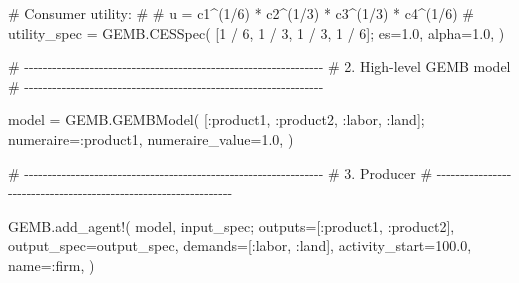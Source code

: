 \documentclass[
  letterpaper,
  DIV=11,
  numbers=noendperiod]{scrreprt}
\newenvironment{Shaded}{\begin{snugshade}}{\end{snugshade}}
\newcommand{\CommentTok}[1]{\textcolor[rgb]{0.37,0.37,0.37}{#1}}
\newcommand{\FloatTok}[1]{\textcolor[rgb]{0.68,0.00,0.00}{#1}}
\newcommand{\FunctionTok}[1]{\textcolor[rgb]{0.28,0.35,0.67}{#1}}
\newcommand{\NormalTok}[1]{\textcolor[rgb]{0.00,0.23,0.31}{#1}}
\newcommand{\OperatorTok}[1]{\textcolor[rgb]{0.37,0.37,0.37}{#1}}
\begin{document}
\begin{codelisting}
{\begin{Shaded}
\begin{Highlighting}[]
\CommentTok{\# Consumer utility:}
\CommentTok{\#}
\CommentTok{\#   u = c1\^{}(1/6) * c2\^{}(1/3) * c3\^{}(1/3) * c4\^{}(1/6)}
\CommentTok{\#}
\NormalTok{utility\_spec }\OperatorTok{=}\NormalTok{ GEMB.}\FunctionTok{CESSpec}\NormalTok{(}
\NormalTok{    [}\FloatTok{1} \OperatorTok{/} \FloatTok{6}\NormalTok{, }\FloatTok{1} \OperatorTok{/} \FloatTok{3}\NormalTok{, }\FloatTok{1} \OperatorTok{/} \FloatTok{3}\NormalTok{, }\FloatTok{1} \OperatorTok{/} \FloatTok{6}\NormalTok{];}
\NormalTok{    es}\OperatorTok{=}\FloatTok{1.0}\NormalTok{,}
\NormalTok{    alpha}\OperatorTok{=}\FloatTok{1.0}\NormalTok{,}
\NormalTok{)}


\CommentTok{\# {-}{-}{-}{-}{-}{-}{-}{-}{-}{-}{-}{-}{-}{-}{-}{-}{-}{-}{-}{-}{-}{-}{-}{-}{-}{-}{-}{-}{-}{-}{-}{-}{-}{-}{-}{-}{-}{-}{-}{-}{-}{-}{-}{-}{-}{-}{-}{-}{-}{-}{-}{-}{-}{-}{-}{-}{-}{-}{-}{-}{-}{-}{-}{-}}
\CommentTok{\# 2. High{-}level GEMB model}
\CommentTok{\# {-}{-}{-}{-}{-}{-}{-}{-}{-}{-}{-}{-}{-}{-}{-}{-}{-}{-}{-}{-}{-}{-}{-}{-}{-}{-}{-}{-}{-}{-}{-}{-}{-}{-}{-}{-}{-}{-}{-}{-}{-}{-}{-}{-}{-}{-}{-}{-}{-}{-}{-}{-}{-}{-}{-}{-}{-}{-}{-}{-}{-}{-}{-}{-}}

\NormalTok{model }\OperatorTok{=}\NormalTok{ GEMB.}\FunctionTok{GEMBModel}\NormalTok{(}
\NormalTok{    [}\OperatorTok{:}\NormalTok{product1, }\OperatorTok{:}\NormalTok{product2, }\OperatorTok{:}\NormalTok{labor, }\OperatorTok{:}\NormalTok{land];}
\NormalTok{    numeraire}\OperatorTok{=:}\NormalTok{product1,}
\NormalTok{    numeraire\_value}\OperatorTok{=}\FloatTok{1.0}\NormalTok{,}
\NormalTok{)}


\CommentTok{\# {-}{-}{-}{-}{-}{-}{-}{-}{-}{-}{-}{-}{-}{-}{-}{-}{-}{-}{-}{-}{-}{-}{-}{-}{-}{-}{-}{-}{-}{-}{-}{-}{-}{-}{-}{-}{-}{-}{-}{-}{-}{-}{-}{-}{-}{-}{-}{-}{-}{-}{-}{-}{-}{-}{-}{-}{-}{-}{-}{-}{-}{-}{-}{-}}
\CommentTok{\# 3. Producer}
\CommentTok{\# {-}{-}{-}{-}{-}{-}{-}{-}{-}{-}{-}{-}{-}{-}{-}{-}{-}{-}{-}{-}{-}{-}{-}{-}{-}{-}{-}{-}{-}{-}{-}{-}{-}{-}{-}{-}{-}{-}{-}{-}{-}{-}{-}{-}{-}{-}{-}{-}{-}{-}{-}{-}{-}{-}{-}{-}{-}{-}{-}{-}{-}{-}{-}{-}}

\NormalTok{GEMB.}\FunctionTok{add\_agent!}\NormalTok{(}
\NormalTok{    model,}
\NormalTok{    input\_spec;}
\NormalTok{    outputs}\OperatorTok{=}\NormalTok{[}\OperatorTok{:}\NormalTok{product1, }\OperatorTok{:}\NormalTok{product2],}
\NormalTok{    output\_spec}\OperatorTok{=}\NormalTok{output\_spec,}
\NormalTok{    demands}\OperatorTok{=}\NormalTok{[}\OperatorTok{:}\NormalTok{labor, }\OperatorTok{:}\NormalTok{land],}
\NormalTok{    activity\_start}\OperatorTok{=}\FloatTok{100.0}\NormalTok{,}
\NormalTok{    name}\OperatorTok{=:}\NormalTok{firm,}
\NormalTok{)}



\end{Highlighting}
\end{Shaded}}
\end{codelisting}
\end{document}
